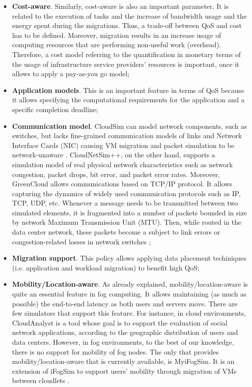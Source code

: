 \begin{itemize}[noitemsep]
\item \textbf{Cost-aware}. Similarly, cost-aware is also an important parameter. It is related to the execution of tasks and the increase of bandwidth usage and the energy spent during the migrations. Thus, a trade-off between QoS and cost has to be defined. Moreover, migration results in an increase usage of computing resources that are performing non-useful work (overhead). Therefore, a cost model referring to the quantification in monetary terms of the usage of infrastructure service providers' resources is important, once it allows to apply a pay-as-you go model;
\item \textbf{Application models}. This is an important feature in terms of QoS because it allows specifying the computational requirements for the application and a specific completion deadline;
\item \textbf{Communication model}. CloudSim can model network components, such as switches, but lacks fine-grained communication models of links and Network Interface Cards (NIC) causing VM migration and packet simulation to be network-unaware \cite{malik2017cloudnetsim++}. CloudNetSim++, on the other hand, supports a simulation model of real physical network characteristics such as network congestion, packet drops, bit error, and packet error rates. Moreover, GreenCloud allows communications based on TCP/IP protocol. It allows capturing the dynamics of widely used communication protocols such as IP, TCP, UDP, etc. Whenever a message needs to be transmitted between two simulated elements, it is fragmented into a number of packets bounded in size by network Maximum Transmission Unit (MTU). Then, while routed in the data center network, these packets become a subject to link errors or congestion-related losses in network switches \cite{kliazovich2012greencloud};
\item \textbf{Migration support}. This policy allows applying data placement techiniques (i.e. application and workload migration) to benefit high QoS;
\item \textbf{Mobility/Location-aware}. As already explained, mobility/location-aware is quite an essential feature in fog computing. It allows maintaining (as much as possible) the end-to-end latency as both users and servers move. There are few simulators that support this feature. For instance, in cloud environments, CloudAnalyst \cite{wickremasinghe2010cloudanalyst} is a tool whose goal is to support the evaluation of social network applications, according to the geographic distribution of users and data centers. However, in fog environments, to the best of our knowledge, there is no support for mobility of fog nodes. The only that provides mobility/location-aware that is currently available, is MyiFogSim. It is an extension of iFogSim to support users' mobility through migration of VMs between cloudlets \cite{lopes2017myifogsim}.
\end{itemize}
